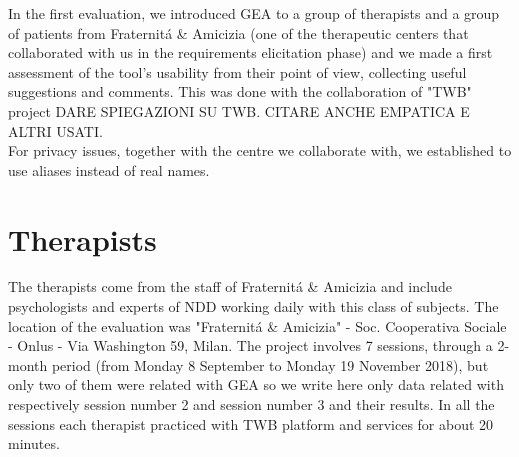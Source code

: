 In the first evaluation, we introduced GEA to a group of therapists and a group of patients from Fraternit\'a \& Amicizia (one of the therapeutic centers that collaborated with us in the requirements elicitation phase) and we made a first assessment of the tool's usability from their point of view, collecting useful suggestions and comments. This was done with the collaboration of "TWB" project DARE SPIEGAZIONI SU TWB. CITARE ANCHE EMPATICA E ALTRI USATI.\\
For privacy issues, together with the centre we collaborate with, we established to use aliases instead of real names.
\section{Therapists}
The therapists come from the staff of Fraternit\'a \& Amicizia and include psychologists and experts of NDD working daily with this class of subjects. The location of the evaluation was "Fraternit\'a \& Amicizia" - Soc. Cooperativa Sociale - Onlus - Via Washington 59, Milan. The project involves 7 sessions, through a 2-month period (from Monday 8 September to Monday 19 November 2018), but only two of them were related with GEA so we write here only data related with respectively session number 2 and session number 3 and their results. In all the sessions each therapist practiced with TWB platform and services for about 20 minutes.\\
